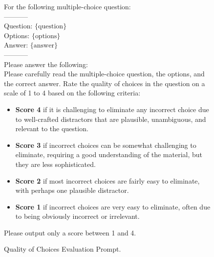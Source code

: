 \begin{figure}[h]
\centering
\begin{tcolorbox}[width=1\columnwidth, fontupper=\footnotesize,title=Quality of Choices  Evaluation Prompt]
\RaggedRight
\obeylines
{For the following multiple-choice question:\\
-----------\\
Question: $\{\text{question}\}$\\
\vspace{3mm}
Options: $\{\text{options}\}$\\
\vspace{3mm}
Answer: $\{\text{answer}\}$\\
-----------\\
Please answer the following:\\
Please carefully read the multiple-choice question, the options, and the correct answer.  
Rate the quality of choices in the question on a scale of 1 to 4 based on the following criteria:
\begin{itemize}[label=-,nosep]
    \item \textbf{Score 4} if it is challenging to eliminate any incorrect choice due to well-crafted distractors that are plausible, unambiguous, and relevant to the question.
    \item \textbf{Score 3} if incorrect choices can be somewhat challenging to eliminate, requiring a good understanding of the material, but they are less sophisticated.
    \item \textbf{Score 2} if most incorrect choices are fairly easy to eliminate, with perhaps one plausible distractor.
    \item \textbf{Score 1} if incorrect choices are very easy to eliminate, often due to being obviously incorrect or irrelevant.
\end{itemize}

Please output only a score between 1 and 4.
}
\end{tcolorbox}
\caption{Quality of Choices  Evaluation Prompt.}
\label{fig:choices_quality_prompt}
\end{figure}



